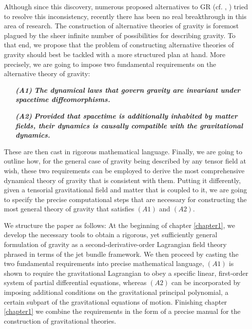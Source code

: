 \documentclass[%
preprint,
nofootinbib,
amsmath,amssymb,
aps,
prd,
floatfix,
]{revtex4-2}
\begin{document}
Although since this discovery, numerous proposed alternatives to GR (cf. \cite{2013LRR....16....9Y}, \cite{fR2}) tried to resolve this inconsistency, recently there has been no real breakthrough in this area of research. The construction of alternative theories of gravity is foremost plagued by the sheer infinite number of possibilities for describing gravity. To that end, we propose that the problem of constructing alternative theories of gravity should best be tackled with a more structured plan at hand.
More precisely, we are going to impose two fundamental requirements on the alternative theory of gravity: 
\begin{itemize}
    \item[\textbf{\textit{(A1)}}] \textbf{\textit{The dynamical laws that govern gravity are invariant under spacetime diffeomorphisms.}}
    \item[\textbf{\textit{(A2)}}] \textbf{\textit{Provided that spacetime is additionally inhabited by matter fields, their dynamics is causally compatible with the gravitational dynamics.}}
\end{itemize}
These are then cast in rigorous mathematical language.
Finally, we are going to outline how, for the general case of gravity being described by any tensor field at wish, these two requirements can be employed to derive the most comprehensive dynamical theory of gravity that is consistent with them.
Putting it differently, given a tensorial gravitational field and matter that is coupled to it, we are going to specify the precise computational steps that are necessary for constructing the most general theory of gravity that satisfies $(A1)$ and $(A2)$.

We structure the paper as follows: 
At the beginning of chapter \ref{chapter1}, we develop the necessary tools to obtain a rigorous, yet sufficiently general formulation of gravity as a second-derivative-order Lagrangian field theory phrased in terms of the jet bundle framework. We then proceed by casting the two fundamental requirements into precise mathematical language, $(A1)$ is shown to require the gravitational Lagrangian to obey a specific linear, first-order system of partial differential equations, whereas $(A2)$ can be incorporated by imposing additional conditions on the gravitational principal polynomial, a certain subpart of the gravitational equations of motion. Finishing chapter \ref{chapter1} we combine the requirements in the form of a precise manual for the construction of gravitational theories.
\end{document}
